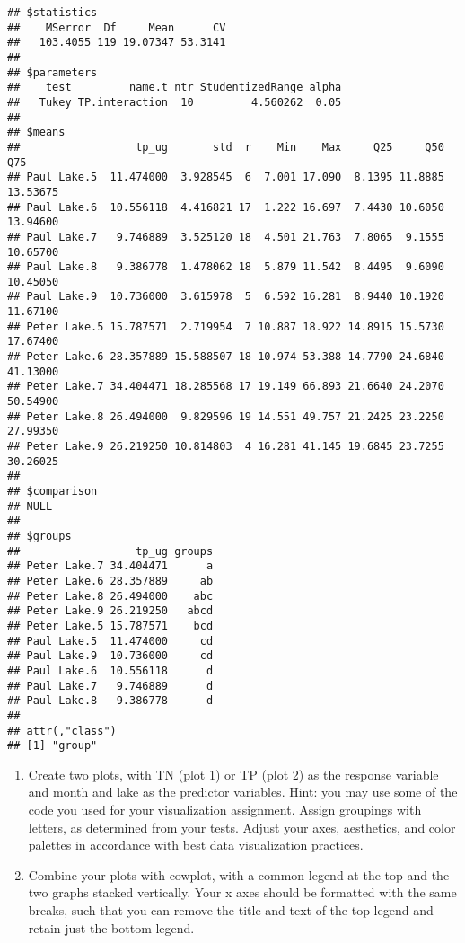 \documentclass[]{article}
\begin{document}
\begin{verbatim}
## $statistics
##    MSerror  Df     Mean      CV
##   103.4055 119 19.07347 53.3141
## 
## $parameters
##    test         name.t ntr StudentizedRange alpha
##   Tukey TP.interaction  10         4.560262  0.05
## 
## $means
##                  tp_ug       std  r    Min    Max     Q25     Q50      Q75
## Paul Lake.5  11.474000  3.928545  6  7.001 17.090  8.1395 11.8885 13.53675
## Paul Lake.6  10.556118  4.416821 17  1.222 16.697  7.4430 10.6050 13.94600
## Paul Lake.7   9.746889  3.525120 18  4.501 21.763  7.8065  9.1555 10.65700
## Paul Lake.8   9.386778  1.478062 18  5.879 11.542  8.4495  9.6090 10.45050
## Paul Lake.9  10.736000  3.615978  5  6.592 16.281  8.9440 10.1920 11.67100
## Peter Lake.5 15.787571  2.719954  7 10.887 18.922 14.8915 15.5730 17.67400
## Peter Lake.6 28.357889 15.588507 18 10.974 53.388 14.7790 24.6840 41.13000
## Peter Lake.7 34.404471 18.285568 17 19.149 66.893 21.6640 24.2070 50.54900
## Peter Lake.8 26.494000  9.829596 19 14.551 49.757 21.2425 23.2250 27.99350
## Peter Lake.9 26.219250 10.814803  4 16.281 41.145 19.6845 23.7255 30.26025
## 
## $comparison
## NULL
## 
## $groups
##                  tp_ug groups
## Peter Lake.7 34.404471      a
## Peter Lake.6 28.357889     ab
## Peter Lake.8 26.494000    abc
## Peter Lake.9 26.219250   abcd
## Peter Lake.5 15.787571    bcd
## Paul Lake.5  11.474000     cd
## Paul Lake.9  10.736000     cd
## Paul Lake.6  10.556118      d
## Paul Lake.7   9.746889      d
## Paul Lake.8   9.386778      d
## 
## attr(,"class")
## [1] "group"
\end{verbatim}

\begin{enumerate}
\def\labelenumi{\arabic{enumi}.}
\setcounter{enumi}{6}
\item
  Create two plots, with TN (plot 1) or TP (plot 2) as the response
  variable and month and lake as the predictor variables. Hint: you may
  use some of the code you used for your visualization assignment.
  Assign groupings with letters, as determined from your tests. Adjust
  your axes, aesthetics, and color palettes in accordance with best data
  visualization practices.
\item
  Combine your plots with cowplot, with a common legend at the top and
  the two graphs stacked vertically. Your x axes should be formatted
  with the same breaks, such that you can remove the title and text of
  the top legend and retain just the bottom legend.
\end{enumerate}
\end{document}
